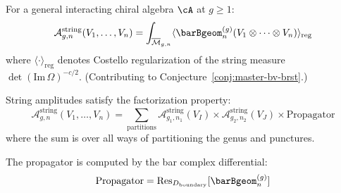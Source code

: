 \begin{conjecture}\label{conj:string-amplitude}
For a general interacting chiral algebra $\cA$ at
$g \geq 1$:
\[
\mathcal{A}_{g,n}^{\mathrm{string}}(V_1, \ldots, V_n)
= \int_{\overline{\mathcal{M}}_{g,n}}
\langle \barBgeom^{(g)}_n
(V_1 \otimes \cdots \otimes V_n)
\rangle_{\mathrm{reg}}
\]
where $\langle \cdot \rangle_{\mathrm{reg}}$ denotes
Costello regularization of the string measure
$\det(\mathrm{Im}\,\Omega)^{-c/2}$.
(Contributing to Conjecture~\ref{conj:master-bv-brst}.)
\end{conjecture}


\begin{theorem}\label{thm:amplitude-factorization}
String amplitudes satisfy the factorization property:
\[\mathcal{A}_{g,n}^{\mathrm{string}}(V_1, \ldots, V_n) = \sum_{\mathrm{partitions}} \mathcal{A}_{g_1,n_1}^{\mathrm{string}}(V_I) \times \mathcal{A}_{g_2,n_2}^{\mathrm{string}}(V_J) \times \mathrm{Propagator}\]
where the sum is over all ways of partitioning the genus and punctures.

The propagator is computed by the bar complex differential:
\[\mathrm{Propagator} = \operatorname{Res}_{D_{\mathrm{boundary}}}[\barBgeom^{(g)}_n]\]
\end{theorem}

